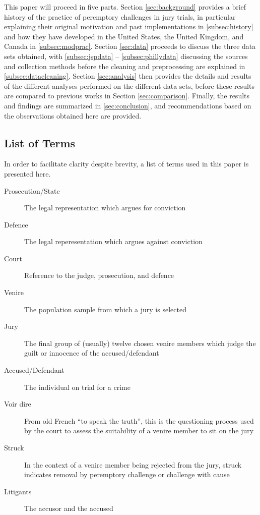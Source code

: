 \documentclass{article}
\begin{document}
This paper will proceed in five parts. Section \ref{sec:background} provides a brief history of the practice of peremptory
challenges in jury trials, in particular explaining their original motivation and past implementations in \ref{subsec:history} and
how they have developed in the United States, the United Kingdom, and Canada in \ref{subsec:modprac}. Section \ref{sec:data}
proceeds to discuss the three data sets obtained, with \ref{subsec:jspdata} -- \ref{subsec:phillydata} discussing the sources and
collection methods before the cleaning and preprocessing are explained in \ref{subsec:datacleaning}. Section \ref{sec:analysis}
then provides the details and results of the different analyses performed on the different data sets, before these results are
compared to previous works in Section \ref{sec:comparison}. Finally, the results and findings are summarized in
\ref{sec:conclusion}, and recommendations based on the observations obtained here are provided.

\subsection{List of Terms} \label{subsec:terms}

In order to facilitate clarity despite brevity, a list of terms used in this paper is presented here.

\begin{description}
\item[Prosecution/State] The legal representation which argues for conviction
\item[Defence] The legal reperesentation which argues against conviction
\item[Court] Reference to the judge, prosecution, and defence
\item[Venire] The population sample from which a jury is selected
\item[Jury] The final group of (usually) twelve chosen venire members which judge the guilt or innocence of the
    accused/defendant
\item[Accused/Defendant] The individual on trial for a crime
\item[Voir dire] From old French ``to speak the truth'', this is the questioning process used by the court to assess the
  suitability of a venire member to sit on the jury
\item[Struck] In the context of a venire member being rejected from the jury, struck indicates removal by peremptory challenge or
  challenge with cause
\item[Litigants] The accusor and the accused
\end{description}
\end{document}
